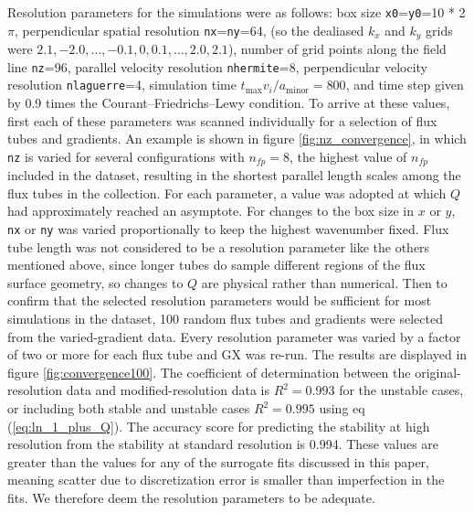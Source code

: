 \documentclass{jpp}
\newcommand{\changed}[1]{{#1}}
\begin{document}
\changed{
Resolution parameters for the simulations were as follows:
box size \texttt{x0}=\texttt{y0}=10 * 2$\pi$,
perpendicular spatial resolution \texttt{nx}=\texttt{ny}=64,
(so the dealiased $k_x$ and $k_y$ grids were $2.1, -2.0, \ldots,-0.1, 0, 0.1, \ldots, 2.0, 2.1$),
number of grid points along the field line \texttt{nz}=96,
parallel velocity resolution \texttt{nhermite}=8,
perpendicular velocity resolution \texttt{nlaguerre}=4,
simulation time $t_\mathrm{max} v_{i} / a_\mathrm{minor}=800$,
and time step given by 0.9 times the Courant–Friedrichs–Lewy condition.
To arrive at these values, first each of these parameters was scanned individually for a selection of flux tubes and gradients.
An example is shown in figure \ref{fig:nz_convergence}, in which \texttt{nz} is varied for several configurations with $n_{fp}=8$, the highest value of $n_{fp}$ included in the dataset, resulting in the shortest parallel length scales among the flux tubes in the collection.
For each parameter, a value was adopted at which $Q$ had approximately reached an asymptote.
For changes to the box size in $x$ or $y$, \texttt{nx} or \texttt{ny} was varied proportionally to keep the highest wavenumber fixed.
Flux tube length was not considered to be a resolution parameter like the others mentioned above, since longer tubes do sample different regions of the flux surface geometry, so changes to $Q$ are physical rather than numerical.
Then to confirm that the selected resolution parameters would be sufficient for most simulations in the dataset, 100 random flux tubes and gradients were selected from the varied-gradient data.
Every resolution parameter was varied by a factor of two or more for each flux tube and GX was re-run.
The results are displayed in figure \ref{fig:convergence100}.
The coefficient of determination between the original-resolution data and modified-resolution data is $R^2=0.993$ for the unstable cases, or including both stable and unstable cases $R^2=0.995$  using eq (\ref{eq:ln_1_plus_Q}).
The accuracy score for predicting the stability at high resolution from the stability at standard resolution is 0.994.
These values are greater than the values for any of the surrogate fits discussed in this paper, meaning scatter due to discretization error is smaller than imperfection in the fits.
We therefore deem the resolution parameters to be adequate.
}
\end{document}
